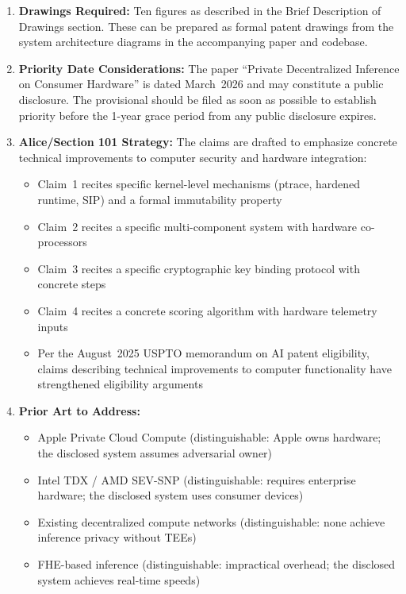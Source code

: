 \documentclass[11pt,letterpaper]{article}
\begin{document}
\begin{enumerate}[nosep]
\item \textbf{Drawings Required:} Ten figures as described in the Brief Description of Drawings section. These can be prepared as formal patent drawings from the system architecture diagrams in the accompanying paper and codebase.

\item \textbf{Priority Date Considerations:} The paper ``Private Decentralized Inference on Consumer Hardware'' is dated March~2026 and may constitute a public disclosure. The provisional should be filed as soon as possible to establish priority before the 1-year grace period from any public disclosure expires.

\item \textbf{Alice/Section 101 Strategy:} The claims are drafted to emphasize concrete technical improvements to computer security and hardware integration:
  \begin{itemize}[nosep]
  \item Claim~1 recites specific kernel-level mechanisms (ptrace, hardened runtime, SIP) and a formal immutability property
  \item Claim~2 recites a specific multi-component system with hardware co-processors
  \item Claim~3 recites a specific cryptographic key binding protocol with concrete steps
  \item Claim~4 recites a concrete scoring algorithm with hardware telemetry inputs
  \item Per the August~2025 USPTO memorandum on AI patent eligibility, claims describing technical improvements to computer functionality have strengthened eligibility arguments
  \end{itemize}

\item \textbf{Prior Art to Address:}
  \begin{itemize}[nosep]
  \item Apple Private Cloud Compute (distinguishable: Apple owns hardware; the disclosed system assumes adversarial owner)
  \item Intel TDX / AMD SEV-SNP (distinguishable: requires enterprise hardware; the disclosed system uses consumer devices)
  \item Existing decentralized compute networks (distinguishable: none achieve inference privacy without TEEs)
  \item FHE-based inference (distinguishable: impractical overhead; the disclosed system achieves real-time speeds)
  \end{itemize}


\end{enumerate}
\end{document}
